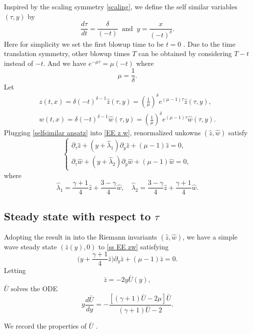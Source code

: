 \documentclass{article}
\newcommand{\ga}{\gamma}
\newcommand{\la}{\lambda}
\def\be{\begin{equation}}
\def\ee{\end{equation}}
\def\beqa{\begin{equation}\begin{aligned}}
\def\eeqa{\end{aligned}\end{equation}}
\numberwithin{equation}{section}
\begin{document}
Inspired by the scaling symmetry \eqref{scaling}, we define 
the self similar variables $(\tau, y)$ by 
\be\label{tau y}
	\frac{d\tau }{dt} = \frac{\delta }{ (- t)} 
    \ \text{ and }\ y = \frac{x}{(-t)^\delta} . 
\ee
Here for simplicity we set the first blowup time to be $t=0$ . Due to the time translation symmetry, other blowup times $T$ can be obtained by considering $T-t$ instead of $-t$. And we have  $e^{-\mu\tau}= \mu (-t) $ where $$\mu= \frac{1}{\delta}.$$  
Let  
\beqa\label{selfsimilar ansatz}
	z(t,x) = \delta (-t)^{\delta -1} \hat z(\tau,y)= (\frac{1}{\mu})^\delta e^{(\mu-1)\tau}\hat z(\tau,y),\\
	w(t,x) = \delta (-t)^{\delta -1} \hat w(\tau,y)= (\frac{1}{\mu})^\delta e^{(\mu-1)\tau}\hat w(\tau,y).
\eeqa
Plugging \eqref{selfsimilar ansatz} into \eqref{EE z w}, renormalized unkowns  $(\hat z, \hat w)$  satisfy 
\be\label{ss EE zw}
	\begin{cases}
	\partial_\tau \hat z + (y+\hat \la_1 ) \partial_y \hat z + (\mu-1)\hat z= 0,\\
	\partial_\tau \hat w + (y+\hat \la_2 ) \partial_y \hat w + (\mu-1)\hat w = 0, 
	\end{cases}
\ee
where 
\be\label{def la1 la2}
\hat \la_1 = \frac{\ga+1}{4} \hat z + \frac{3-\ga}{4} \hat w, \quad 
	\hat \la_2 =  \frac{3-\ga}{4} \hat z + \frac{\ga+1}{4} \hat w. 
\ee


\subsection{Steady state with respect to $\tau$}\label{sec:SSS}


Adopting the result in \cite{JLN2025} into the Riemann invariants $(\hat z, \hat w)$, we have a simple wave steady state $(\bar z(y), 0)$ to \eqref{ss EE zw} satisfying 
\be \label{2.8}
	\Big(y+ \frac{\ga+1}{4}\bar z\Big) \partial_y \bar z + (\mu-1)\bar z= 0. 
\ee
Letting
\be\label{z = -2y U}
	\bar z = -2y \bar U(y), 
\ee
 $\bar U$ solves  the ODE 
\be\label{ode B}
	y \frac{d\bar U}{dy} = -\frac{[(\ga+1)\bar U-2\mu]\bar U}{(\ga+1) \bar U-2}.
\ee



\smallskip 

 

We record the properties of $\bar U$ \cite{JLN2025}. 
\end{document}

